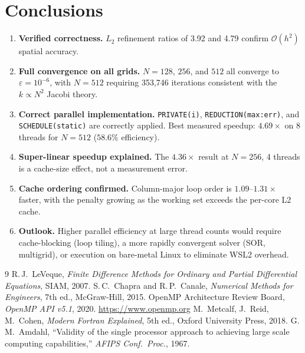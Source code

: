 \documentclass[12pt,a4paper]{article}
\begin{document}
\section{Conclusions}

\begin{enumerate}[noitemsep]
  \item \textbf{Verified correctness.}  $L_2$ refinement ratios of 3.92 and
        4.79 confirm $\mathcal{O}(h^2)$ spatial accuracy.
  \item \textbf{Full convergence on all grids.}  $N=128$, $256$, and $512$
        all converge to $\varepsilon=10^{-6}$, with $N=512$ requiring
        353,746 iterations consistent with the $k\propto N^2$ Jacobi theory.
  \item \textbf{Correct parallel implementation.}  \texttt{PRIVATE(i)},
        \texttt{REDUCTION(max:err)}, and \texttt{SCHEDULE(static)} are
        correctly applied. Best measured speedup: $\mathbf{4.69\times}$ on
        8 threads for $N=512$ ($58.6\%$ efficiency).
  \item \textbf{Super-linear speedup explained.}  The $4.36\times$ result
        at $N=256$, 4 threads is a cache-size effect, not a measurement error.
  \item \textbf{Cache ordering confirmed.}  Column-major loop order is
        $1.09$--$1.31\times$ faster, with the penalty growing as the working
        set exceeds the per-core L2 cache.
  \item \textbf{Outlook.}  Higher parallel efficiency at large thread counts
        would require cache-blocking (loop tiling), a more rapidly convergent
        solver (SOR, multigrid), or execution on bare-metal Linux to eliminate
        WSL2 overhead.
\end{enumerate}

\begin{thebibliography}{9}
R.\,J.\ LeVeque, \textit{Finite Difference Methods for Ordinary and Partial
Differential Equations}, SIAM, 2007.
S.\,C.\ Chapra and R.\,P.\ Canale, \textit{Numerical Methods for Engineers},
7th ed., McGraw-Hill, 2015.
OpenMP Architecture Review Board, \textit{OpenMP API v5.1}, 2020.
\url{https://www.openmp.org}
M.\ Metcalf, J.\ Reid, M.\ Cohen, \textit{Modern Fortran Explained}, 5th ed.,
Oxford University Press, 2018.
G.\,M.\ Amdahl, ``Validity of the single processor approach to achieving
large scale computing capabilities,'' \textit{AFIPS Conf.\ Proc.}, 1967.
\end{thebibliography}
\end{document}
